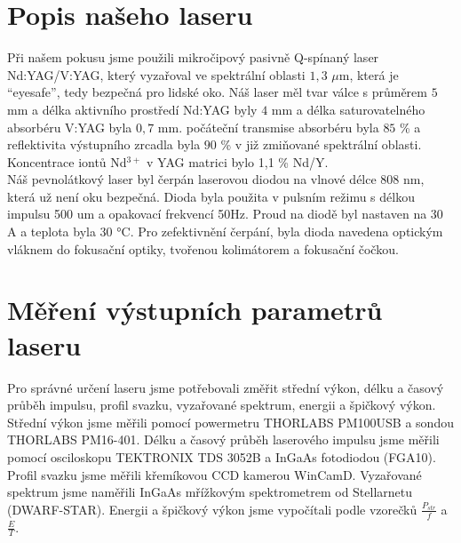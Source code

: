 \documentclass[12pt,a4paper]{article}
\begin{document}
\section{Popis našeho laseru}
Při našem pokusu jsme použili mikročipový pasivně Q-spínaný laser Nd:YAG/V:YAG, který vyzařoval ve spektrální oblasti $1,3$ $\mu$m, která je “eyesafe”, tedy bezpečná pro lidské oko. Náš laser měl tvar válce s průměrem $5$ mm a délka aktivního prostředí Nd:YAG byly $4$ mm a délka saturovatelného absorbéru V:YAG byla $0,7$ mm. počáteční transmise absorbéru byla $85$ \% a reflektivita výstupního zrcadla byla $90$ \% v již zmiňované spektrální oblasti. Koncentrace iontů Nd$^{3+}$ v YAG matrici bylo 1,1 \% Nd/Y. 
\\Náš pevnolátkový laser byl čerpán laserovou diodou na vlnové délce 808 nm, která už není oku bezpečná. Dioda byla použita v pulsním režimu s délkou impulsu 500 um a opakovací frekvencí 50Hz. Proud na diodě byl nastaven na 30 A a teplota byla 30 °C. Pro zefektivnění čerpání, byla dioda navedena optickým vláknem do fokusační optiky, tvořenou kolimátorem a fokusační čočkou.

\pagebreak
\section{Měření výstupních parametrů laseru}
Pro správné určení laseru jsme potřebovali změřit střední výkon, délku a časový průběh impulsu, profil svazku, vyzařované spektrum, energii a špičkový výkon. Střední výkon jsme měřili pomocí powermetru THORLABS PM100USB a sondou THORLABS PM16-401. Délku a časový průběh laserového impulsu jsme měřili pomocí osciloskopu TEKTRONIX TDS 3052B a InGaAs fotodiodou (FGA10). Profil svazku jsme měřili křemíkovou CCD kamerou WinCamD. Vyzařované spektrum jsme naměřili InGaAs mřížkovým spektrometrem od Stellarnetu (DWARF-STAR). Energii a špičkový výkon jsme vypočítali podle vzorečků
$\frac{P_{str}}{f}$ a $\frac{E}{T}$.
\end{document}
